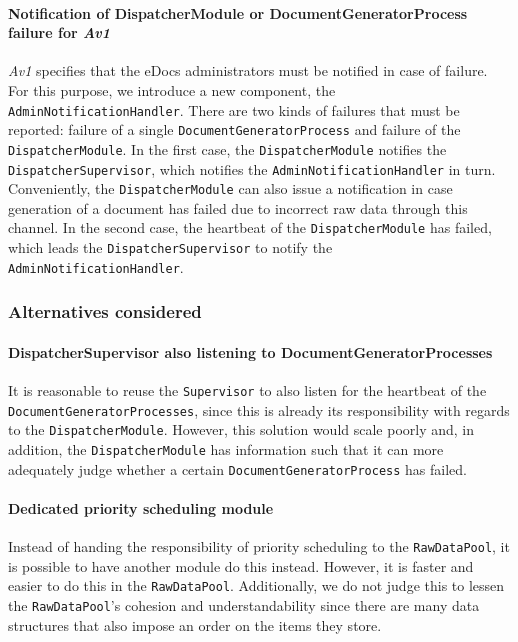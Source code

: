 \documentclass[a4paper,10pt]{article}
\begin{document}
\paragraph{Notification of DispatcherModule or DocumentGeneratorProcess failure for \emph{Av1}}
\emph{Av1} specifies that the eDocs administrators must be notified in case of failure. For this purpose, we introduce a new component, the \texttt{AdminNotificationHandler}. There are two kinds of failures that must be reported: failure of a single \texttt{DocumentGeneratorProcess} and failure of the \texttt{DispatcherModule}. In the first case, the \texttt{DispatcherModule} notifies the \texttt{DispatcherSupervisor}, which notifies the \texttt{AdminNotificationHandler} in turn. Conveniently, the \texttt{DispatcherModule} can also issue a notification in case generation of a document has failed due to incorrect raw data through this channel. In the second case, the heartbeat of the \texttt{DispatcherModule} has failed, which leads the \texttt{DispatcherSupervisor} to notify the \texttt{AdminNotificationHandler}.

\subsubsection*{Alternatives considered}
\paragraph{DispatcherSupervisor also listening to DocumentGeneratorProcesses}
It is reasonable to reuse the \texttt{Supervisor} to also listen for the heartbeat of the \texttt{DocumentGeneratorProcesses}, since this is already its responsibility with regards to the \texttt{DispatcherModule}. However, this solution would scale poorly and, in addition, the \texttt{DispatcherModule} has information such that it can more adequately judge whether a certain \texttt{DocumentGeneratorProcess} has failed.

\paragraph{Dedicated priority scheduling module}
Instead of handing the responsibility of priority scheduling to the \texttt{RawDataPool}, it is possible to have another module do this instead. However, it is faster and easier to do this in the \texttt{RawDataPool}. Additionally, we do not judge this to lessen the \texttt{RawDataPool}'s cohesion and understandability since there are many data structures that also impose an order on the items they store.
\end{document}

